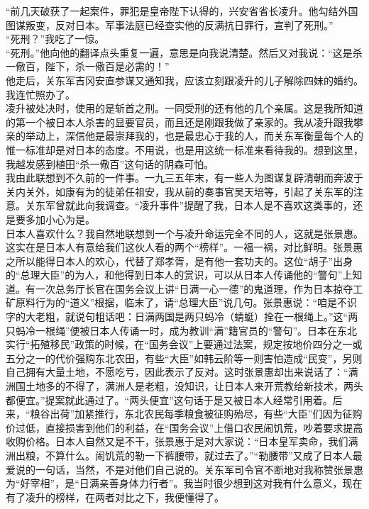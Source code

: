 “前几天破获了一起案件，罪犯是皇帝陛下认得的，兴安省省长凌升。他勾结外国图谋叛变，反对日本。军事法庭已经查实他的反满抗日罪行，宣判了死刑。”\\

“死刑？”我吃了一惊。\\

“死刑。”他向他的翻译点头重复一遍，意思是向我说清楚。然后又对我说：“这是杀一儆百，陛下，杀一儆百是必需的！”\\

他走后，关东军吉冈安直参谋又通知我，应该立刻跟凌升的儿子解除四妹的婚约。我连忙照办了。\\

凌升被处决时，使用的是斩首之刑。一同受刑的还有他的几个亲属。这是我所知道的第一个被日本人杀害的显要官员，而且还是刚跟我做了亲家的。我从凌升跟我攀亲的举动上，深信他是最崇拜我的，也是最忠心于我的人，而关东军衡量每个人的惟一标准却是对日本的态度。不用说，也是用这统一标准来看待我的。想到这里，我越发感到植田“杀一儆百”这句话的阴森可怕。\\

我由此联想到不久前的一件事。一九三五年末，有一些人为图谋复辟清朝而奔波于关内关外，如康有为的徒弟任祖安，我从前的奏事官吴天培等，引起了关东军的注意。关东军曾就此向我调查。“凌升事件”提醒了我，日本人是不喜欢这类事的，还是要多加小心为是。\\

日本人喜欢什么？我自然地联想到一个与凌升命运完全不同的人，这就是张景惠。这实在是日本人有意给我们这伙人看的两个“榜样”。一福一祸，对比鲜明。张景惠之所以能得日本人的欢心，代替了郑孝胥，是有他一套功夫的。这位“胡子”出身的“总理大臣”的为人，和他得到日本人的赏识，可以从日本人传诵他的“警句”上知道。有一次总务厅长官在国务会议上讲“日满一心一德”的鬼道理，作为日本掠夺工矿原料行为的“道义”根据，临末了，请“总理大臣”说几句。张景惠说：“咱是不识字的大老粗，就说句粗话吧：日满两国是两只蚂冷（蜻蜓）拴在一根绳上。”这“两只蚂冷一根绳”便被日本人传诵一时，成为教训“满”籍官员的“警句”。日本在东北实行“拓殖移民”政策的时候，在“国务会议”上要通过法案，规定按地价四分之一或五分之一的代价强购东北农田，有些“大臣”如韩云阶等一则害怕造成“民变”，另则自己拥有大量土地，不愿吃亏，因此表示了反对。这时张景惠却出来说话了：“满洲国土地多的不得了，满洲人是老粗，没知识，让日本人来开荒教给新技术，两头都便宜。”提案就此通过了。“两头便宜”这句话于是又被日本人经常引用着。后来，“粮谷出荷”加紧推行，东北农民每季粮食被征购殆尽，有些“大臣”们因为征购价过低，直接损害到他们的利益，在“国务会议”上借口农民闹饥荒，吵着要求提高收购价格。日本人自然又是不干，张景惠于是对大家说：“日本皇军卖命，我们满洲出粮，不算什么。闹饥荒的勒一下裤腰带，就过去了。”“勒腰带”又成了日本人最爱说的一句话，当然，不是对他们自己说的。关东军司令官不断地对我称赞张景惠为“好宰相”，是“日满亲善身体力行者”。我当时很少想到这对我有什么意义，现在有了凌升的榜样，在两者对比之下，我便懂得了。\\

